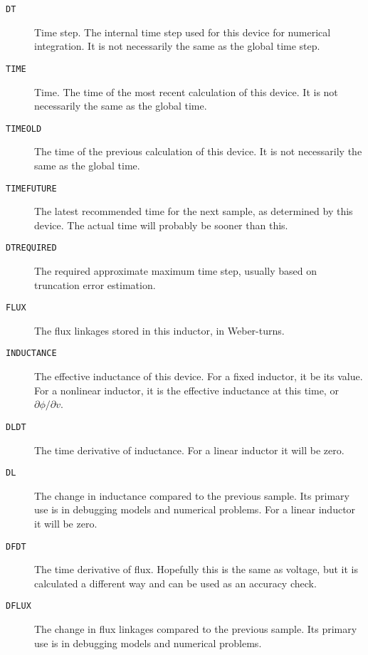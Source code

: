 \begin{description}

\item[{\tt DT}]
Time step.  The internal time step used for this device for numerical
integration.  It is not necessarily the same as the global time step.
  
\item[{\tt TIME}]
Time.  The time of the most recent calculation of this device.  It is
not necessarily the same as the global time.
  
\item[{\tt TIMEOLD}] 
The time of the previous calculation of this device.  It is not
necessarily the same as the global time.
  
\item[{\tt TIMEFUTURE}]
The latest recommended time for the next sample, as determined by this
device.  The actual time will probably be sooner than this.

\item[{\tt DTREQUIRED}]
The required approximate maximum time step, usually based on
truncation error estimation.
  
\item[{\tt FLUX}]
The flux linkages stored in this inductor, in Weber-turns.
  
\item[{\tt INDUCTANCE}]
The effective inductance of this device.  For a fixed inductor, it
be its value.  For a nonlinear inductor, it is the effective
inductance at this time, or $\partial \phi / \partial v$.
  
\item[{\tt DLDT}]
The time derivative of inductance.  For a linear inductor it will be
zero.
  
\item[{\tt DL}]
The change in inductance compared to the previous sample.  Its
primary use is in debugging models and numerical problems.  For a
linear inductor it will be zero.
  
\item[{\tt DFDT}]
The time derivative of flux.  Hopefully this is the same as voltage,
but it is calculated a different way and can be used as an accuracy
check.
  
\item[{\tt DFLUX}]
The change in flux linkages compared to the previous sample.  Its
primary use is in debugging models and numerical problems.

\end{description}
